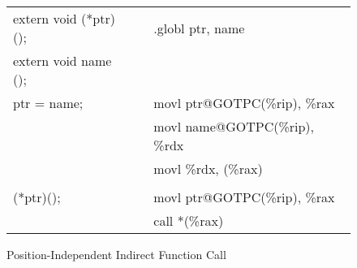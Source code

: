 \begin{figure}[H]
\Hrule
\caption{Position-Independent Indirect Function Call}
\begin{center}
\begin{tabular}{|l|c|l|}
\cline{1-1}\cline{3-3}
extern void (*ptr) ();    &&.globl ptr, name\\
extern void name ();      && \\
ptr = name;               &&movl ptr@GOTPC(\%rip), \%rax  \\
                          &&movl name@GOTPC(\%rip), \%rdx  \\
                          &&movl \%rdx, (\%rax)  \\
                          &&  \\
(*ptr)();                 &&movl ptr@GOTPC(\%rip), \%rax  \\
                          &&call *(\%rax)  \\
\cline{1-1}\cline{3-3}
\end{tabular}
\end{center}
\Hrule
\end{figure}



